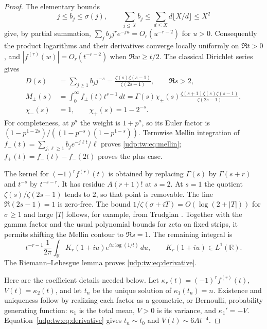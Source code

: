 \documentclass[11pt]{article}
\theoremstyle{remark}\newtheorem{remark}[theorem]{Remark}
\numberwithin{equation}{section}
\begin{document}
\begin{proof}
The elementary bounds
\[
 j\le b_j\le\sigma(j),\qquad
 \sum_{j\le X}b_j\le
 \sum_{d\le X}d\lfloor X/d\rfloor\le X^2
\]
give, by partial summation,
$\sum_j b_jj^re^{-ju}=O_r(u^{-r-2})$ for $u>0$.
Consequently the product logarithms and their derivatives converge
locally uniformly on $\Re t>0$, and
$|f^{(r)}(w)|=O_r(t^{-r-2})$ when $\Re w\ge t/2$.
The classical Dirichlet series \cite[Section~4.9]{toth} gives
\begin{align}
 D(s)&=\sum_{j\ge1}b_jj^{-s}
 =\frac{\zeta(s)\zeta(s-1)}{\zeta(2s-1)},\qquad \Re s>2,\nonumber\\
 M_\pm(s)&=\int_0^\infty f_\pm(t)t^{s-1}\,dt
 =\Gamma(s)\chi_\pm(s)
   \frac{\zeta(s+1)\zeta(s)\zeta(s-1)}{\zeta(2s-1)},\label{udp:tw:eq:mellin}\\
 \chi_-(s)&=1,\qquad \chi_+(s)=1-2^{-s}.\nonumber
\end{align}
For completeness, at $p^a$ the weight is $1+p^a$, so its Euler factor is
$(1-p^{1-2s})/((1-p^{-s})(1-p^{1-s}))$.
Termwise Mellin integration of
$f_-(t)=\sum_{j,\ell\ge1}b_je^{-j\ell t}/\ell$ proves
\eqref{udp:tw:eq:mellin}; $f_+(t)=f_-(t)-f_-(2t)$ proves the plus case.

The kernel for $(-1)^rf^{(r)}(t)$ is obtained by replacing $\Gamma(s)$
by $\Gamma(s+r)$ and $t^{-s}$ by $t^{-s-r}$.
It has residue $A(r+1)!$ at $s=2$.
At $s=1$ the quotient $\zeta(s)/\zeta(2s-1)$ tends to $2$,
so that point is removable. The line $\Re(2s-1)=1$ is zero-free.
The bound $1/\zeta(\sigma+iT)=O(\log(2+|T|))$ for $\sigma\ge1$
and large $|T|$ follows, for example, from Trudgian
\cite{trudgian}. Together with the gamma factor and the usual
polynomial bounds for zeta on fixed strips, it permits shifting the
Mellin contour to $\Re s=1$. The remaining integral is
\[
 t^{-r-1}\frac1{2\pi}
 \int_{\mathbb R}K_r(1+iu)e^{iu\log(1/t)}\,du,
 \qquad K_r(1+iu)\in L^1(\mathbb R).
\]
The Riemann--Lebesgue lemma proves \eqref{udp:tw:eq:derivative}.

Here are the coefficient details needed below. Let
$\kappa_r(t)=(-1)^rf^{(r)}(t)$, $V(t)=\kappa_2(t)$, and let $t_n$ be
the unique solution of $\kappa_1(t_n)=n$. Existence and uniqueness follow
by realizing each factor as a geometric, or Bernoulli, probability
generating function: $\kappa_1$ is the total mean, $V>0$ is its variance,
and $\kappa_1'=-V$. Equation~\eqref{udp:tw:eq:derivative} gives
$t_n\sim t_0$ and $V(t)\sim6At^{-4}$.


\end{proof}
\end{document}
